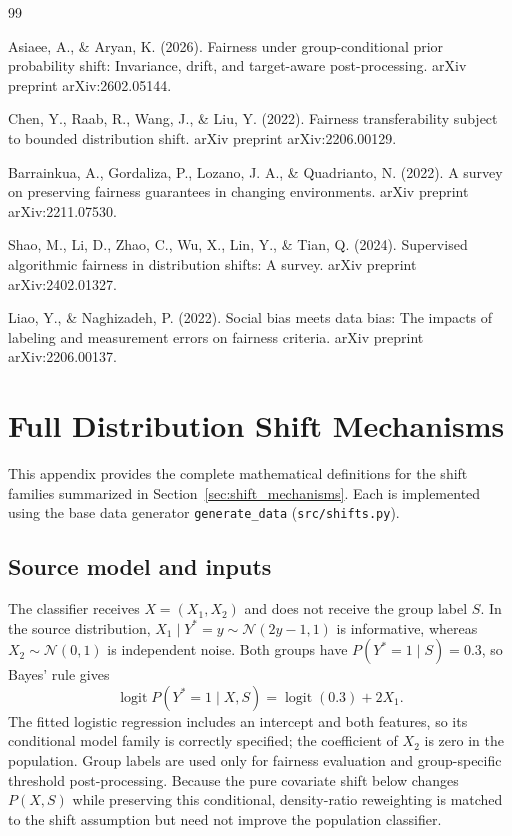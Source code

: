\documentclass[11pt, letterpaper]{article}
\begin{document}
\clearpage
\begin{thebibliography}{99}

Asiaee, A., \& Aryan, K. (2026). Fairness under group-conditional prior probability shift:
Invariance, drift, and target-aware post-processing. arXiv preprint arXiv:2602.05144.

Chen, Y., Raab, R., Wang, J., \& Liu, Y. (2022). Fairness transferability subject to bounded
distribution shift. arXiv preprint arXiv:2206.00129.

Barrainkua, A., Gordaliza, P., Lozano, J. A., \& Quadrianto, N. (2022). A survey on preserving
fairness guarantees in changing environments. arXiv preprint arXiv:2211.07530.

Shao, M., Li, D., Zhao, C., Wu, X., Lin, Y., \& Tian, Q. (2024). Supervised algorithmic fairness
in distribution shifts: A survey. arXiv preprint arXiv:2402.01327.

Liao, Y., \& Naghizadeh, P. (2022). Social bias meets data bias: The impacts of labeling and
measurement errors on fairness criteria. arXiv preprint arXiv:2206.00137.

\end{thebibliography}

\newpage
\appendix

\section{Full Distribution Shift Mechanisms}
\label{app:a}

This appendix provides the complete mathematical definitions for the shift families summarized in Section~\ref{sec:shift_mechanisms}. Each is implemented using the base data generator \texttt{generate\_data} (\texttt{src/shifts.py}).

\subsection{Source model and inputs}

The classifier receives $X=(X_1,X_2)$ and does not receive the group label $S$. In the source distribution, $X_1\mid Y^*=y\sim\mathcal{N}(2y-1,1)$ is informative, whereas $X_2\sim\mathcal{N}(0,1)$ is independent noise. Both groups have $P(Y^*=1\mid S)=0.3$, so Bayes' rule gives
\[
\operatorname{logit}P(Y^*=1\mid X,S)=\operatorname{logit}(0.3)+2X_1.
\]
The fitted logistic regression includes an intercept and both features, so its conditional model family is correctly specified; the coefficient of $X_2$ is zero in the population. Group labels are used only for fairness evaluation and group-specific threshold post-processing. Because the pure covariate shift below changes $P(X,S)$ while preserving this conditional, density-ratio reweighting is matched to the shift assumption but need not improve the population classifier.
\end{document}
